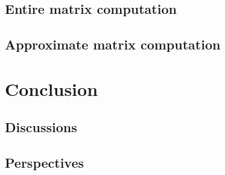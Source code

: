 \documentclass[]{article}
\begin{document}
\subsection{Entire matrix computation}


\subsection{Approximate matrix computation}


\section{Conclusion}

\subsection{Discussions}


\subsection{Perspectives}


\printbibliography
\end{document}
